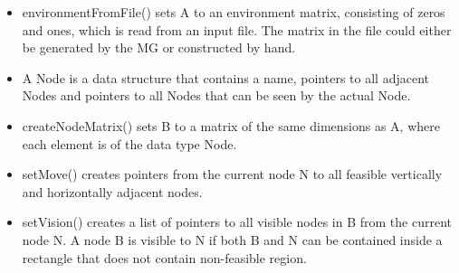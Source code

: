 \begin{itemize}
\item environmentFromFile() sets A to an environment matrix, consisting of zeros and ones, which is read from an input file. The matrix in the file could either be generated by the MG or constructed by hand.
\item A Node is a data structure that contains a name, pointers to all adjacent Nodes and pointers to all Nodes that can be seen by the actual Node.
\item createNodeMatrix() sets B to a matrix of the same dimensions as A, where each element is of the data type Node.
\item setMove() creates pointers from the current node N to all feasible vertically and horizontally adjacent nodes.
\item setVision() creates a list of pointers to all visible nodes in B from the current node N. A node B is visible to N if both B and N can be contained inside a rectangle that does not contain non-feasible region.

\end{itemize}